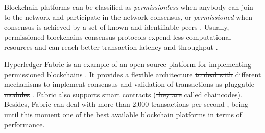 \documentclass[sigplan]{acmart}
\providecommand{\DIFadd}[1]{{\protect\color{blue}\uwave{#1}}} %
\providecommand{\DIFdel}[1]{{\protect\color{red}\sout{#1}}}                      %
\providecommand{\DIFaddbegin}{} %
\providecommand{\DIFaddend}{} %
\providecommand{\DIFdelbegin}{} %
\providecommand{\DIFdelend}{} %
\begin{document}
Blockchain platforms can be classified as \emph{permissionless} when anybody can join to the network and participate in the network consensus, or \emph{permissioned} when consensus is achieved by a set of known and identifiable peers \cite{Vukolic2016,Androulaki2018}. 
Usually, permissioned blockchains consensus protocols expend less computational resources and can reach better transaction latency and throughput \cite{Sousa2018}.

Hyperledger Fabric is an example of an open source platform for implementing permissioned blockchains \cite{Androulaki2018}.
It provides a flexible architecture \DIFdelbegin \DIFdel{to deal with }\DIFdelend \DIFaddbegin \DIFadd{that accomodates }\DIFaddend different mechanisms to implement consensus and validation of transactions \DIFdelbegin \DIFdel{as pluggable modules }\DIFdelend \cite{Sousa2018}.
Fabric also supports smart contracts (\DIFdelbegin \DIFdel{they are }\DIFdelend called chaincodes).
Besides, Fabric can deal with more than 2,000 transactions per second \cite{Androulaki2018}, being until this moment one of the best available blockchain platforms in terms of performance.

\end{document}
